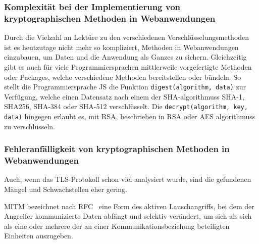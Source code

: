 \subsubsection{Komplexität bei der Implementierung von kryptographischen Methoden in Webanwendungen}\label{subsubsec:komplexität_bei_der_implementierung_von_kryptographischen_methoden_in_webanwendungen}
Durch die Vielzahl an Lektüre zu den verschiedenen Verschlüsselungsmethoden\autocites[\zb][]{davies2011implementing} ist es heutzutage nicht mehr so kompliziert,  Methoden in Webanwendungen einzubauen, um Daten und die Anwendung als Ganzes zu sichern.
Gleichzeitig gibt es auch für viele Programmiersprachen mittlerweile vorgefertigte Methoden oder Packages, welche verschiedene  Methoden bereitstellen oder bündeln. So stellt die Programmiersprache \ac{JS} die Funktion \lstinline!digest(algorithm, data)! zur Verfügung, welche einen Datensatz nach einem der \ac{SHA}-\glspl{algorithmus} \ac{SHA}-1, \gls{SHA256}, \ac{SHA}-384 oder \ac{SHA}-512 verschlüsselt.\autocite[\vglf][]{SubtleCr83:online} Die \lstinline!decrypt(algorithm, key, data)! hingegen erlaubt es, mit RSA, beschrieben in \ac{RSA} oder \ac{AES} \glspl{algorithmus} zu verschlüsseln.

\subsubsection{Fehleranfälligkeit von kryptographischen Methoden in Webanwendungen}\label{subsubsec:fehleranfälligkeit_von_kryptographischen_methoden_in_webanwendungen}
Auch, wenn das \ac{TLS}-Protokoll schon viel analysiert wurde\autocites[Siehe \zb][]{krawczyk2013security, paulson1999inductive, dowling2015cryptographic, cremers2017comprehensive}, sind die gefundenen Mängel und Schwachstellen eher gering.\autocite[\vglf][]{OPPLIGER20062238} 

\begin{definition}
    \ac{MITM} bezeichnet nach \ac{RFC}\ \autocite[Übersetzt aus][]{rfc2828} eine Form des aktiven Lauschangriffs, bei dem der Angreifer kommunizierte Daten abfängt und selektiv verändert, um sich als sich als eine oder mehrere der an einer Kommunikationsbeziehung beteiligten Einheiten auszugeben.
\end{definition}

